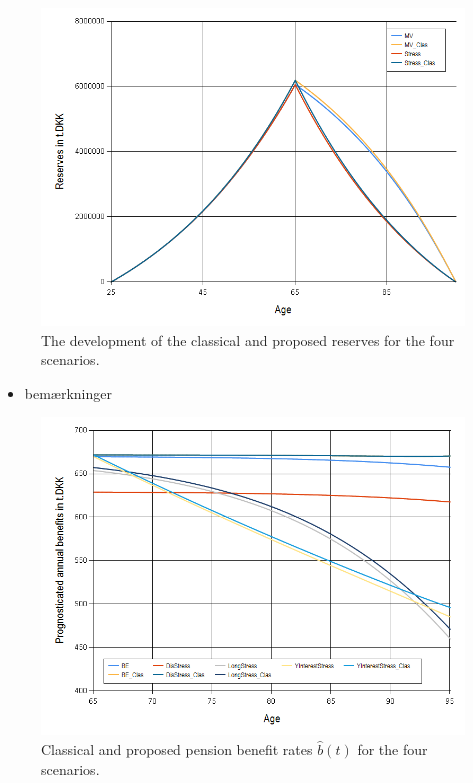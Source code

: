 \documentclass{book}
\newcommand{\1}[1]{\mathbbm{1}_{\left\lbrace #1 \right\rbrace}}
\theoremstyle{break}
\theoremstyle{remark}
\numberwithin{equation}{section}
\begin{document}
\begin{figure}[H]
	\centering
	\caption{The development of the classical and proposed reserves for the four scenarios.}
	\includegraphics[width=\textwidth]{Reserves}
\end{figure}

\begin{itemize}
	\item bemærkninger
\end{itemize}

\begin{figure}[H]
	\centering
	\caption{Classical and proposed pension benefit rates $\hat{b}(t)$ for the four scenarios.}
	\includegraphics[width=\textwidth]{Benefits}
\end{figure}
\end{document}
